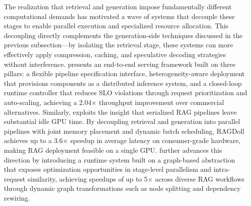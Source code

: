 \documentclass[11pt]{article}
\begin{document}
The realization that retrieval and generation impose fundamentally different computational demands has motivated a wave of systems that decouple these stages to enable parallel execution and specialized resource allocation. This decoupling directly complements the generation-side techniques discussed in the previous subsection---by isolating the retrieval stage, these systems can more effectively apply compression, caching, and speculative decoding strategies without interference. \cite{ref537} presents an end-to-end serving framework built on three pillars: a flexible pipeline specification interface, heterogeneity-aware deployment that provisions components as a distributed inference system, and a closed-loop runtime controller that reduces SLO violations through request prioritization and auto-scaling, achieving a 2.04× throughput improvement over commercial alternatives. Similarly, \cite{ref538} exploits the insight that serialized RAG pipelines leave substantial idle GPU time. By decoupling retrieval and generation into parallel pipelines with joint memory placement and dynamic batch scheduling, RAGDoll achieves up to a 3.6× speedup in average latency on consumer-grade hardware, making RAG deployment feasible on a single GPU. \cite{ref539} further advances this direction by introducing a runtime system built on a graph-based abstraction that exposes optimization opportunities in stage-level parallelism and intra-request similarity, achieving speedups of up to 5× across diverse RAG workflows through dynamic graph transformations such as node splitting and dependency rewiring.
\end{document}
